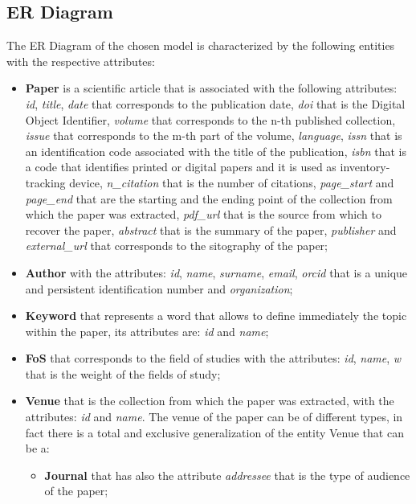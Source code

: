 \documentclass{Configuration_Files/PoliMi3i_thesis}
\begin{document}
\subsection{ER Diagram}
\label{sub:er1}
The ER Diagram of the chosen model is characterized by the following entities with the respective attributes:\\
\begin{itemize}
    \item \textbf{Paper} is a scientific article that is associated with the following attributes:\\
            \textit{id}, \textit{title}, \textit{date} that corresponds to the publication date, \textit{doi} that is the Digital Object Identifier, \textit{volume} that corresponds to the n-th published collection, \textit{issue} that corresponds to the m-th part of the volume, \textit{language}, \textit{issn} that is an identification code associated with the title of the publication, \textit{isbn} that is a code that identifies printed or digital papers and it is used as inventory-tracking device, \textit{n\_citation} that is the number of citations, \textit{page\_start} and \textit{page\_end} that are the starting and the ending point of the collection from which the paper was extracted, \textit{pdf\_url} that is the source from which to recover the paper, \textit{abstract} that is the summary of the paper, \textit{publisher} and \textit{external\_url} that corresponds to the sitography of the paper;
    \item \textbf{Author} with the attributes: \textit{id}, \textit{name}, \textit{surname}, \textit{email}, \textit{orcid} that is a unique and persistent identification number and \textit{organization};
    \item \textbf{Keyword} that represents a word that allows to define immediately the topic within the paper, its attributes are: \textit{id} and \textit{name};
    \item \textbf{FoS} that corresponds to the field of studies with the attributes: \textit{id}, \textit{name}, \textit{w} that is the weight of the fields of study;
    \item \textbf{Venue} that is the collection from which the paper was extracted, with the attributes: \textit{id} and \textit{name}. The venue of the paper can be of different types, in fact there is a total and exclusive generalization of the entity Venue that can be a:
        \begin{itemize}
            \item \textbf{Journal} that has also the attribute \textit{addressee} that is the type of audience of the paper;

\end{itemize}
\end{itemize}
\end{document}
